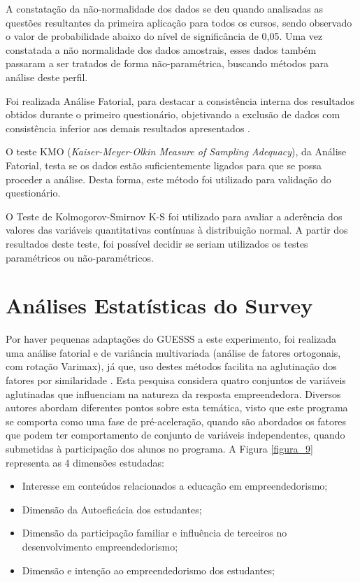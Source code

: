 A constatação da não-normalidade dos dados se deu quando analisadas as questões resultantes da primeira aplicação para todos os cursos, sendo observado o valor de probabilidade abaixo do nível de significância de 0,05. Uma vez constatada a não normalidade dos dados amostrais, esses dados também passaram a ser tratados de forma não-paramétrica, buscando métodos para análise deste perfil.

Foi realizada Análise Fatorial, para destacar a consistência interna dos resultados obtidos durante o primeiro questionário, objetivando a exclusão de dados com consistência inferior aos demais resultados apresentados .

O teste KMO (\textit{Kaiser-Meyer-Olkin Measure of Sampling Adequacy}), da Análise Fatorial, testa se os dados estão suficientemente ligados para que se possa proceder a análise. Desta forma, este método foi utilizado para validação do questionário.

O Teste de Kolmogorov-Smirnov K-S foi utilizado para avaliar a aderência dos valores das variáveis quantitativas contínuas à distribuição normal. A partir dos resultados deste teste, foi possível decidir se seriam utilizados os testes paramétricos ou não-paramétricos.

\section{Análises Estatísticas do Survey}


Por haver pequenas adaptações do GUESSS a este experimento, foi realizada uma análise fatorial e de variância multivariada (análise de fatores ortogonais, com rotação Varimax), já que, uso destes métodos facilita na aglutinação dos fatores por similaridade \cite{hair_multivariate_2006}. Esta pesquisa considera quatro conjuntos de variáveis aglutinadas que influenciam na natureza da resposta empreendedora. Diversos autores abordam diferentes pontos sobre esta temática, visto que este programa se comporta como uma fase de pré-aceleração, quando são abordados os fatores que podem ter comportamento de conjunto de variáveis independentes, quando submetidas à participação dos alunos no programa. A Figura \ref{figura_9} representa as 4 dimensões estudadas:


\begin{itemize}
\item {Interesse em conteúdos relacionados a educação em empreendedorismo;}
\item {Dimensão da Autoeficácia dos estudantes;}
\item {Dimensão da participação familiar e influência de terceiros no desenvolvimento empreendedorismo;}
\item {Dimensão e intenção  ao empreendedorismo dos estudantes;}
\end{itemize}




